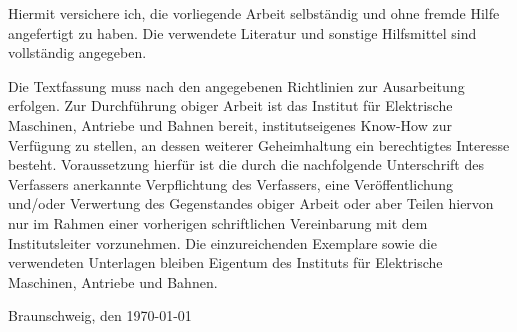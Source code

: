 
\vspace*{3cm}

\normalfont
Hiermit versichere ich, die vorliegende Arbeit selbständig und ohne
fremde Hilfe angefertigt zu haben. Die verwendete Literatur und
sonstige Hilfsmittel sind vollständig angegeben.

\bigskip
Die Textfassung muss nach den angegebenen Richtlinien zur Ausarbeitung
erfolgen. Zur Durchführung obiger Arbeit ist das Institut für Elektrische 
Maschinen, Antriebe und Bahnen bereit, institutseigenes Know-How zur
Verfügung zu stellen, an dessen weiterer Geheimhaltung ein berechtigtes
Interesse besteht. Voraussetzung hierfür ist die durch die nachfolgende
Unterschrift des Verfassers anerkannte Verpflichtung des Verfassers, eine
Veröffentlichung und/oder Verwertung des Gegenstandes obiger Arbeit oder
aber Teilen hiervon nur im Rahmen einer vorherigen schriftlichen
Vereinbarung mit dem Institutsleiter vorzunehmen. Die einzureichenden
Exemplare sowie die verwendeten Unterlagen bleiben Eigentum des Instituts
für Elektrische Maschinen, Antriebe und Bahnen.

\bigskip
\bigskip
\noindent Braunschweig, den \today

